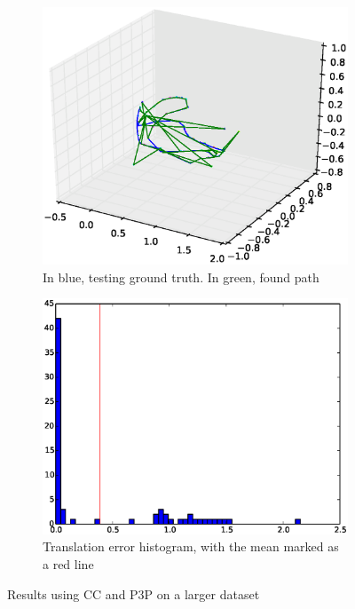\begin{figure}[htpb]
  \begin{subfigure}[b]{6cm}
          \includegraphics[width=\linewidth]{img/large_desktop/CC_3pt_path.eps}
          \caption{In blue, testing ground truth. In green, found path}                
          \label{fig:desktop_2_ferns_path_1}
  \end{subfigure}   
  \qquad
  \begin{subfigure}[b]{6cm}
          \includegraphics[width=\linewidth]{img/large_desktop/CC_3pt_dist.eps}
          \caption{Translation error histogram, with the mean marked as a red line}                
          \label{fig:desktop_2_ferns_dist_1}
  \end{subfigure}
  \caption{Results using CC and P3P on a larger dataset}
\end{figure}


